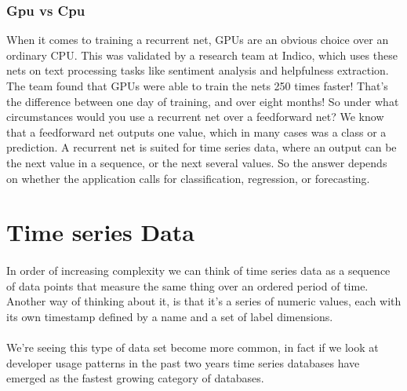 \documentclass{article}
\begin{document}
    \subsubsection{Gpu vs Cpu}
    When it comes to training a recurrent net, GPUs are an obvious choice over an ordinary CPU. This was validated by a research team at Indico, which uses these nets on text processing tasks like sentiment analysis and helpfulness extraction. The team found that GPUs were able to train the nets 250 times faster! That’s the difference between one day of training, and over eight months! So under what circumstances would you use a recurrent net over a feedforward net? We know that a feedforward net outputs one value, which in many cases was a class or a prediction. A recurrent net is suited for time series data, where an output can be the next value in a sequence, or the next several values. So the answer depends on whether the application calls for classification, regression, or forecasting.

    \newpage
    \section{Time series Data}
    \paragraph{}
    In order of increasing complexity we can think of time series data as a sequence of data points that measure the same thing over an ordered period of time. Another way of thinking about it, is that it's a series of numeric values, each with its own timestamp defined by a name and a set of label dimensions.
    \paragraph{} 
    We're seeing this type of data set become more common, in fact if we look at developer usage patterns in the past two years time series databases have emerged as the fastest growing category of databases.
    
    
    
\end{document}
